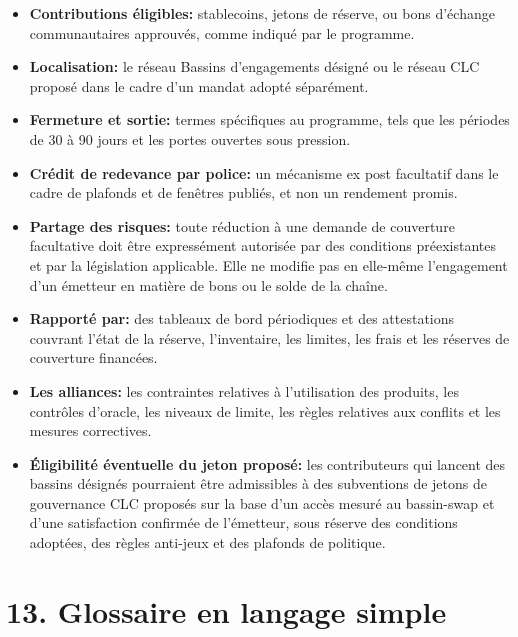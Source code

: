 \documentclass[11pt]{article}
\begin{document}
\begin{itemize}[leftmargin=*]
\item \textbf{Contributions éligibles:} stablecoins, jetons de réserve, ou bons d'échange communautaires approuvés, comme indiqué par le programme.
\item \textbf{Localisation:} le réseau Bassins d'engagements désigné ou le réseau CLC proposé dans le cadre d'un mandat adopté séparément.
\item \textbf{Fermeture et sortie:} termes spécifiques au programme, tels que les périodes de 30 à 90 jours et les portes ouvertes sous pression.
\item \textbf{Crédit de redevance par police:} un mécanisme ex post facultatif dans le cadre de plafonds et de fenêtres publiés, et non un rendement promis.
\item \textbf{Partage des risques:} toute réduction à une demande de couverture facultative doit être expressément autorisée par des conditions préexistantes et par la législation applicable. Elle ne modifie pas en elle-même l'engagement d'un émetteur en matière de bons ou le solde de la chaîne.
\item \textbf{Rapporté par:} des tableaux de bord périodiques et des attestations couvrant l'état de la réserve, l'inventaire, les limites, les frais et les réserves de couverture financées.
\item \textbf{Les alliances:} les contraintes relatives à l'utilisation des produits, les contrôles d'oracle, les niveaux de limite, les règles relatives aux conflits et les mesures correctives.
\item \textbf{Éligibilité éventuelle du jeton proposé:} les contributeurs qui lancent des bassins désignés pourraient être admissibles à des subventions de jetons de gouvernance CLC proposés sur la base d'un accès mesuré au bassin-swap et d'une satisfaction confirmée de l'émetteur, sous réserve des conditions adoptées, des règles anti-jeux et des plafonds de politique.
\end{itemize}


\section*{13. Glossaire en langage simple}
\end{document}
